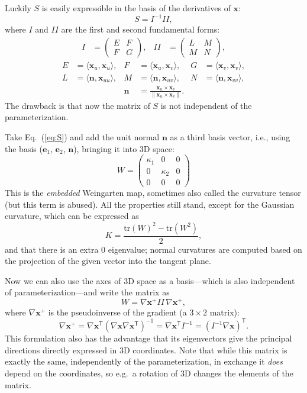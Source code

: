 \documentclass[a4paper]{article}
\begin{document}
Luckily $S$ is easily expressible in the basis of the derivatives of
$\mathbf{x}$:
\[S=I^{-1}I\!I,\]
where $I$ and $I\!I$ are the first and second fundamental forms:
\begin{align*}
  I &= \begin{pmatrix}E&F\\F&G\end{pmatrix}, &
  I\!I &= \begin{pmatrix}L&M\\M&N\end{pmatrix},
\end{align*}
\begin{align*}
  E &= \langle\mathbf{x}_u,\mathbf{x}_u\rangle, &
  F &= \langle\mathbf{x}_u,\mathbf{x}_v\rangle, &
  G &= \langle\mathbf{x}_v,\mathbf{x}_v\rangle,\\
  L &= \langle\mathbf{n},\mathbf{x}_{uu}\rangle, &
  M &= \langle\mathbf{n},\mathbf{x}_{uv}\rangle, &
  N &= \langle\mathbf{n},\mathbf{x}_{vv}\rangle,\\
  && \mathbf{n} &= \frac{\mathbf{x}_u\times\mathbf{x}_v}{\|{\mathbf{x}_u\times\mathbf{x}_v}\|}. &&
\end{align*}
The drawback is that now the matrix of $S$ is not independent of the parameterization.

Take Eq.~(\ref{eq:S}) and add the unit normal $\mathbf{n}$ as a
third basis vector, i.e., using the basis ($\mathbf{e}_1$,
$\mathbf{e}_2$, $\mathbf{n}$), bringing it into 3D space:
\[
  W=
  \begin{pmatrix}
    \kappa_1 & 0 & 0\\
    0 & \kappa_2 & 0\\
    0 & 0 & 0
  \end{pmatrix}
\]
This is the \emph{embedded} Weingarten map, sometimes also called the
curvature tensor (but this term is abused). All the properties still
stand, except for the Gaussian curvature, which can be expressed as
\[K = \frac{\mathrm{tr}(W)^2-\mathrm{tr}(W^2)}{2},\]
and that there is an extra $0$ eigenvalue; normal curvatures are
computed based on the projection of the given vector into the tangent plane.

Now we can also use the axes of 3D space as a basis---which is also
independent of parameterization---and write the matrix as
\[W=\nabla\mathbf{x}^+I\!I\,\nabla\mathbf{x}^+,\]
where $\nabla\mathbf{x}^+$ is the pseudoinverse of the gradient (a $3\times2$ matrix):
\[\nabla\mathbf{x}^+=
\nabla\mathbf{x}^\textsf{T}(\nabla\mathbf{x}\nabla\mathbf{x}^\textsf{T})^{-1}=
\nabla\mathbf{x}^\textsf{T}I^{-1}=
(I^{-1}\nabla\mathbf{x})^\textsf{T}.\]
This formulation also has the advantage that its eigenvectors give the
principal directions directly expressed in 3D coordinates. Note that
while this matrix is exactly the same, independently of the
parameterization, in exchange it \emph{does} depend on the
coordinates, so e.g.~a rotation of 3D changes the elements of the
matrix.
\end{document}
